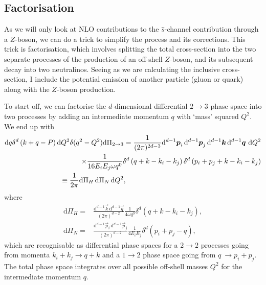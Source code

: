 \documentclass[../main.tex]{subfiles}
\begin{document}
\subsection{Factorisation}
As we will only look at NLO contributions to the \(\hat{s}\)-channel contribution through a \(Z\)-boson, we can do a trick to simplify the process and its corrections.
This trick is factorisation, which involves splitting the total cross-section into the two separate processes of the production of an off-shell \(Z\)-boson, and its subsequent decay into two neutralinos.
Seeing as we are calculating the inclusive cross-section, I include the potential emission of another particle (gluon or quark) along with the \(Z\)-boson production.

To start off, we can factorise the \(d\)-dimensional differential \(2\to 3\) phase space into two processes by adding an intermediate momentum \(q\) with `mass' squared \(Q^2\).
We end up with
\begin{align}
  \label{pc:eq:dPi_factorised}
  \nonumber
  \mathrm{d}q \delta^d\pclosed{k+q-P} \mathrm{d}Q^2 \delta(q^2-Q^2) \mathrm{d}\Pi_{2\to 3} = \frac{1}{(2\pi)^{2d-3}}\mathrm{d}^{d-1}\vec{p}_i\,\mathrm{d}^{d-1}\vec{p}_j\,\mathrm{d}^{d-1}\vec{k}\,\mathrm{d}^{d-1}\vec{q}\,\,\mathrm{d}Q^2 \\
  \nonumber
  \times \frac{1}{16E_i E_j\omega q^0} \delta^d\pclosed{q+k - k_i-k_j}\delta^d\pclosed{p_i+p_j+k - k_i-k_j}                                                                                                                                 \\
  \equiv \frac{1}{2\pi} \mathrm{d}\Pi_H\, \mathrm{d}\Pi_N\, \mathrm{d}Q^2,\hspace{6.7cm}
\end{align}
where
\begin{subequations}
  \begin{align}
    \label{pc:eq:Pi_H}
    \mathrm{d}\Pi_H = & \frac{\mathrm{d}^{d-1}\vec{k}\, \mathrm{d}^{d-1}\vec{q}}{(2\pi)^{d-2}} \frac{1}{4\omega q^0} \delta^d(q+k-k_i-k_j), \\
    \label{pc:eq:Pi_N}
    \mathrm{d}\Pi_N = & \frac{\mathrm{d}^{d-1}\vec{p}_i\, \mathrm{d}^{d-1}\vec{p}_j}{(2\pi)^{d-2}} \frac{1}{4E_i E_j} \delta^d(p_i+p_j-q),
  \end{align}
\end{subequations}
which are recognisable as differential phase spaces for a \(2\to 2\) processes going from momenta \(k_i+k_j \to q+k\) and a \(1\to 2\) phase space going from \(q\ \to p_i+p_j\).
The total phase space integrates over all possible off-shell masses \(Q^2\) for the intermediate momentum \(q\).
\end{document}
